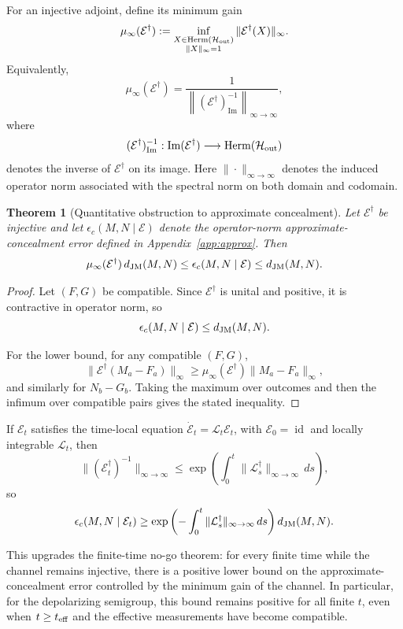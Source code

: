 \documentclass[
aps,pra,twocolumn,10pt,
superscriptaddress,longbibliography,floatfix
]{revtex4-2}
\DeclareMathOperator{\Herm}{Herm}
\DeclareMathOperator{\im}{Im}
\DeclareMathOperator{\id}{id}
\newtheorem{theorem}{Theorem}[section]
\begin{document}
For an injective adjoint, define its minimum gain
\[
\mu_\infty(\mathcal E^\dagger)
:=
\inf_{\substack{
X\in\Herm(\mathcal H_{\rm out})\\
\|X\|_\infty=1}}
\|\mathcal E^\dagger(X)\|_\infty.
\]
Equivalently,
\[
\mu_\infty(\mathcal E^\dagger)
=
\frac{1}{
\left\|
(\mathcal E^\dagger)^{-1}_{\im}
\right\|_{\infty\to\infty}
},
\]
where
\[
(\mathcal E^\dagger)^{-1}_{\im}:
\im(\mathcal E^\dagger)
\longrightarrow
\Herm(\mathcal H_{\rm out})
\]
denotes the inverse of $\mathcal E^\dagger$ on its image. Here \(\|\cdot\|_{\infty\to\infty}\) denotes the induced operator norm associated with the spectral norm on both domain and codomain.

\begin{theorem}[Quantitative obstruction to approximate concealment]
\label{thm:quantitative_obstruction}
Let $\mathcal E^\dagger$ be injective and let $\epsilon_c(M,N\mid\mathcal E)$ denote the operator-norm approximate-concealment error defined in Appendix~\ref{app:approx}. Then
\[
\mu_\infty(\mathcal E^\dagger)\, d_{\rm JM}(M,N)
\le
\epsilon_c(M,N\mid\mathcal E)
\le
d_{\rm JM}(M,N).
\]
\end{theorem}

\begin{proof}
Let $(F,G)$ be compatible. Since $\mathcal E^\dagger$ is unital and positive, it is contractive in operator norm, so
\[
\epsilon_c(M,N\mid\mathcal E)\le d_{\rm JM}(M,N).
\]

For the lower bound, for any compatible $(F,G)$,
\[
\|\mathcal E^\dagger(M_a-F_a)\|_\infty
\ge
\mu_\infty(\mathcal E^\dagger)\|M_a-F_a\|_\infty,
\]
and similarly for $N_b-G_b$. Taking the maximum over outcomes and then the infimum over compatible pairs gives the stated inequality.
\end{proof}

If $\mathcal E_t$ satisfies the time-local equation $\dot{\mathcal E}_t=\mathcal L_t\mathcal E_t$, with $\mathcal E_0=\id$ and locally integrable $\mathcal L_t$, then
\[
\|(\mathcal E_t^\dagger)^{-1}\|_{\infty\to\infty}
\le
\exp\left(\int_0^t \|\mathcal L_s^\dagger\|_{\infty\to\infty}\,ds\right),
\]
so
\[
\epsilon_c(M,N\mid\mathcal E_t)
\ge
\exp\left(-\int_0^t \|\mathcal L_s^\dagger\|_{\infty\to\infty}\,ds\right)
d_{\rm JM}(M,N).
\]

This upgrades the finite-time no-go theorem: for every finite time while the channel remains injective, there is a positive lower bound on the approximate-concealment error controlled by the minimum gain of the channel. In particular, for the depolarizing semigroup, this bound remains positive for all finite $t$, even when $t\ge t_{\rm eff}$ and the effective measurements have become compatible.
\end{document}
